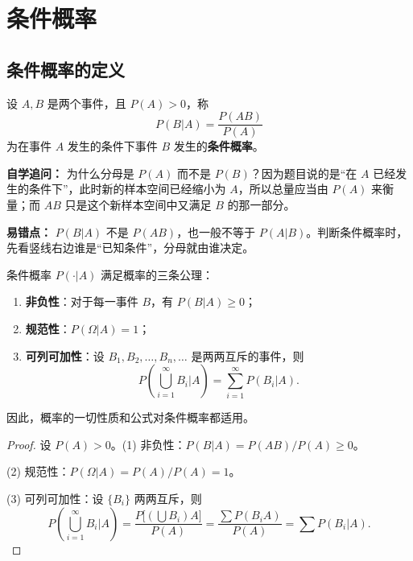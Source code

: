﻿\documentclass[lang=cn,11pt]{elegantbook}
\begin{document}
\section{条件概率}

\subsection{条件概率的定义}

\begin{definition}[条件概率] \label{def:conditional-prob}
设 \(A, B\) 是两个事件，且 \(P(A) > 0\)，称
\[
P(B|A) = \frac{P(AB)}{P(A)}
\]
为在事件 \(A\) 发生的条件下事件 \(B\) 发生的\textbf{条件概率}。
\end{definition}

\begin{note}
\textbf{自学追问：} 为什么分母是 \(P(A)\) 而不是 \(P(B)\)？因为题目说的是“在 \(A\) 已经发生的条件下”，此时新的样本空间已经缩小为 \(A\)，所以总量应当由 \(P(A)\) 来衡量；而 \(AB\) 只是这个新样本空间中又满足 \(B\) 的那一部分。

\textbf{易错点：} \(P(B|A)\) 不是 \(P(AB)\)，也一般不等于 \(P(A|B)\)。判断条件概率时，先看竖线右边谁是“已知条件”，分母就由谁决定。
\end{note}

\begin{property}\label{prop:conditional-prob}
条件概率 \(P(\cdot|A)\) 满足概率的三条公理：
\begin{enumerate}
    \item \textbf{非负性}：对于每一事件 \(B\)，有 \(P(B|A) \ge 0\)；
    \item \textbf{规范性}：\(P(\Omega|A) = 1\)；
    \item \textbf{可列可加性}：设 \(B_1, B_2, \dots, B_n, \dots\) 是两两互斥的事件，则
    \[
    P\!\left(\bigcup_{i=1}^{\infty} B_i \Big| A\right) = \sum_{i=1}^{\infty} P(B_i|A).
    \]
\end{enumerate}
因此，概率的一切性质和公式对条件概率都适用。
\end{property}
\begin{proof}
设 \(P(A) > 0\)。(1) 非负性：\(P(B|A) = P(AB)/P(A) \geqslant 0\)。\par
(2) 规范性：\(P(\Omega|A) = P(A)/P(A) = 1\)。\par
(3) 可列可加性：设 \(\{B_i\}\) 两两互斥，则
\[
P\!\left(\bigcup_{i=1}^{\infty} B_i \Big| A\right) = \frac{P\!\bigl[(\bigcup B_i)A\bigr]}{P(A)} = \frac{\sum P(B_i A)}{P(A)} = \sum P(B_i|A).
\]
\end{proof}
\end{document}
